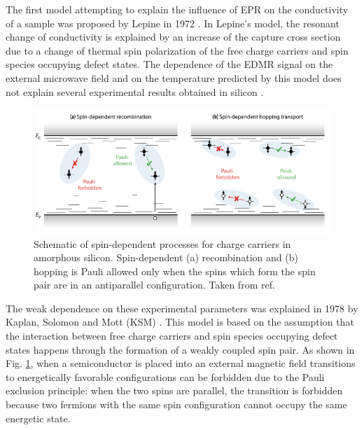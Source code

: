 \documentclass[a4paper]{book}
\begin{document}
	The first model attempting to explain the influence of EPR on the conductivity of a sample was proposed by Lepine in 1972 \cite{lepineSpinDependentRecombinationSilicon1972}. In Lepine's model, the resonant change of conductivity is explained by an increase of the capture cross section due to a change of thermal spin polarization of the free charge carriers and spin species occupying defect states. The dependence of the EDMR signal on the external microwave field and on the temperature predicted by this model does not explain several experimental results obtained in silicon \cite{streetSpindependentPhotoconductivityUndoped1982}\cite{brandtElectricallyDetectedMagnetic1998}.\\
	\begin{figure}
		\centering
		\includegraphics[width=\textwidth]{images/2_pauli_principle}
		\caption{Schematic of spin-dependent processes for charge carriers in amorphous silicon. Spin-dependent (a) recombination and (b) hopping is Pauli allowed only when the spins which form the spin pair are in an antiparallel configuration. Taken from ref. \cite{moserChargeTransportAmorphous2019}}
		\label{fig:2_pauli_principle}
	\end{figure}
	The weak dependence on these experimental parameters was explained in 1978 by Kaplan, Solomon and Mott (KSM) \cite{kaplanExplanationLargeSpindependent1978}. This model is based on the assumption that the interaction between free charge carriers and spin species occupying defect states happens through the formation of a weakly coupled spin pair. As shown in Fig. \ref{fig:2_pauli_principle}, when a semiconductor is placed into an external magnetic field transitions to energetically favorable configurations can be forbidden due to the Pauli exclusion principle: when the two spins are parallel, the transition is forbidden because two fermions %
	with the same spin configuration cannot occupy the same energetic state.\\
\end{document}
